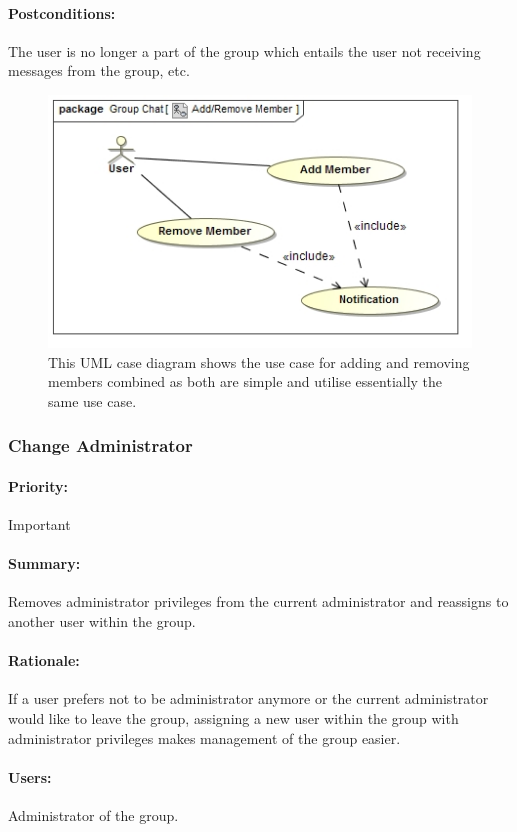 \documentclass[11pt]{article}
\begin{document}
\paragraph{{Postconditions:}}
The user is no longer a part of the group which entails the user not receiving messages from the group, etc.
\begin{figure}[H]
\centering
\includegraphics[width=5in]{./images/UC_AddRemove_Member.jpg}
\caption[Add/Remove Member use case]{This UML case diagram shows the use case for adding and removing members combined as both are simple and utilise essentially the same use case.}
\label{UC-figure-addremove-member}
\end{figure}

\subsubsection{Change Administrator} \label{UC-change-admin}
\paragraph{Priority:} Important
\paragraph{Summary:}
Removes administrator privileges from the current administrator and reassigns to another user within the group.
\paragraph{Rationale:}
If a user prefers not to be administrator anymore or the current administrator would like to leave the group, assigning a new user within the group with administrator privileges makes management of the group easier.
\paragraph{Users:}
Administrator of the group.
\end{document}

